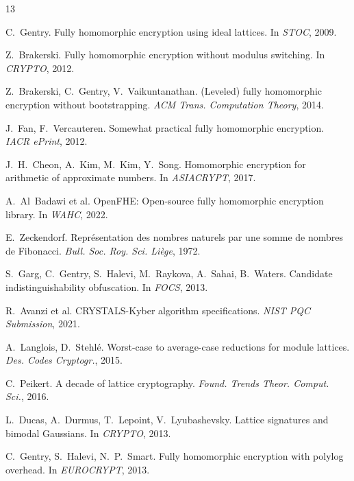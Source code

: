 \documentclass[11pt,a4paper]{article}
\begin{document}
\begin{thebibliography}{13}

C.~Gentry.
\newblock Fully homomorphic encryption using ideal lattices.
\newblock In \textit{STOC}, 2009.

Z.~Brakerski.
\newblock Fully homomorphic encryption without modulus switching.
\newblock In \textit{CRYPTO}, 2012.

Z.~Brakerski, C.~Gentry, V.~Vaikuntanathan.
\newblock (Leveled) fully homomorphic encryption without bootstrapping.
\newblock \textit{ACM Trans. Computation Theory}, 2014.

J.~Fan, F.~Vercauteren.
\newblock Somewhat practical fully homomorphic encryption.
\newblock \textit{IACR ePrint}, 2012.

J.~H.~Cheon, A.~Kim, M.~Kim, Y.~Song.
\newblock Homomorphic encryption for arithmetic of approximate numbers.
\newblock In \textit{ASIACRYPT}, 2017.

A.~Al~Badawi et al.
\newblock OpenFHE: Open-source fully homomorphic encryption library.
\newblock In \textit{WAHC}, 2022.

E.~Zeckendorf.
\newblock Repr\'esentation des nombres naturels par une somme de nombres de Fibonacci.
\newblock \textit{Bull. Soc. Roy. Sci. Li\`ege}, 1972.

S.~Garg, C.~Gentry, S.~Halevi, M.~Raykova, A.~Sahai, B.~Waters.
\newblock Candidate indistinguishability obfuscation.
\newblock In \textit{FOCS}, 2013.

R.~Avanzi et al.
\newblock CRYSTALS-Kyber algorithm specifications.
\newblock \textit{NIST PQC Submission}, 2021.

A.~Langlois, D.~Stehl\'e.
\newblock Worst-case to average-case reductions for module lattices.
\newblock \textit{Des. Codes Cryptogr.}, 2015.

C.~Peikert.
\newblock A decade of lattice cryptography.
\newblock \textit{Found. Trends Theor. Comput. Sci.}, 2016.

L.~Ducas, A.~Durmus, T.~Lepoint, V.~Lyubashevsky.
\newblock Lattice signatures and bimodal Gaussians.
\newblock In \textit{CRYPTO}, 2013.

C.~Gentry, S.~Halevi, N.~P.~Smart.
\newblock Fully homomorphic encryption with polylog overhead.
\newblock In \textit{EUROCRYPT}, 2013.

\end{thebibliography}
\end{document}

